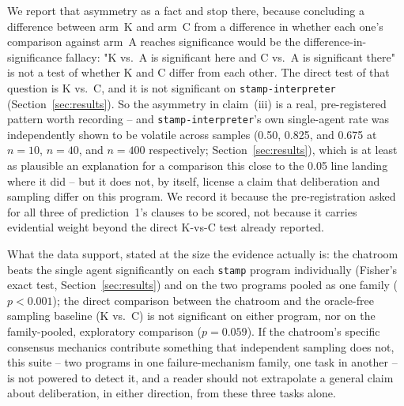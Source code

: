 We report that asymmetry as a fact and stop there, because concluding a difference between arm~K and
arm~C from a difference in whether each one's comparison against arm~A reaches significance would be
the difference-in-significance fallacy: "K vs.\ A is significant here and C vs.\ A is significant there"
is not a test of whether K and C differ from each other. The direct test of that question is K vs.\ C,
and it is not significant on \texttt{stamp-interpreter} (Section~\ref{sec:results}). So the asymmetry in
claim~(iii) is a real, pre-registered pattern worth recording -- and \texttt{stamp-interpreter}'s own
single-agent rate was independently shown to be volatile across samples (0.50, 0.825, and 0.675 at
$n=10$, $n=40$, and $n=400$ respectively; Section~\ref{sec:results}), which is at least as plausible an
explanation for a comparison this close to the 0.05 line landing where it did -- but it does not, by
itself, license a claim that deliberation and sampling differ on this program. We record it because the
pre-registration asked for all three of prediction~1's clauses to be scored, not because it carries
evidential weight beyond the direct K-vs-C test already reported.

What the data support, stated at the size the evidence actually is: the chatroom beats the single agent
significantly on each \texttt{stamp} program individually (Fisher's exact test, Section~\ref{sec:results})
and on the two programs pooled as one family ($p<0.001$); the direct comparison between the chatroom and
the oracle-free sampling baseline (K vs.\ C) is not significant on either program, nor on the
family-pooled, exploratory comparison ($p=0.059$). If the chatroom's specific consensus mechanics
contribute something that independent sampling does not, this suite -- two programs in one
failure-mechanism family, one task in another -- is not powered to detect it, and a reader should not
extrapolate a general claim about deliberation, in either direction, from these three tasks alone.
